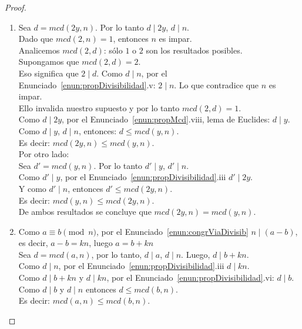 \begin{proof}
\begin{enumerate}[label=\roman*)]
Como $p \mid a$ entonces $a=pk$. \\
Como $p \mid b$ entonces $b=ph$. \\
Luego, $mcd(a,b) = ax + by = (pk)x + (ph)y = p(kx+hy)$. \\
Por lo tanto, $p \mid mcd(a,b)$.
\item Sea $d = mcd(2y,n)$. Por lo tanto $d \mid 2y$, $d \mid n$. \\
Dado que $mcd(2,n) = 1$, entonces $n$ es impar. \\
Analicemos $mcd(2,d)$: sólo $1$ o $2$ son los resultados posibles. \\
Supongamos que $mcd(2,d) = 2$. \\
Eso significa que $2 \mid d$. Como $d \mid n$, por el  Enunciado~\ref{enun:propDivisibilidad}.v: $2 \mid n$. Lo que contradice que $n$ es impar. \\
Ello invalida nuestro supuesto y por lo tanto $mcd(2,d) = 1$. \\
Como $d \mid 2y$, por el Enunciado~\ref{enun:propMcd}.viii, lema de Euclides: $d \mid y$. \\
Como $d \mid y$, $d \mid n$, entonces: $d \leq mcd(y,n)$. \\
Es decir: $mcd(2y,n) \leq mcd(y,n)$. \\
Por otro lado: \\
Sea $d' = mcd(y,n)$. Por lo tanto $d' \mid y$, $d' \mid n$. \\
Como $d' \mid y$, por el Enunciado~\ref{enun:propDivisibilidad}.iii $d' \mid 2y$. \\
Y como $d' \mid n$, entonces $d' \leq mcd(2y,n)$. \\
Es decir:  $mcd(y,n) \leq mcd(2y,n)$. \\
De ambos resultados se concluye que $mcd(2y,n) = mcd(y,n)$.
\item Como $a \equiv b \pmod n$, por el Enunciado~\ref{enun:congrViaDivisib} $n \mid (a-b)$, es decir, $a - b = kn$, luego  $a = b+kn$ \\
Sea $d = mcd(a,n)$, por lo tanto, $d \mid a$, $d \mid n$. Luego, $d \mid b+kn$. \\
Como $d \mid n$, por el Enunciado~\ref{enun:propDivisibilidad}.iii $d \mid kn$. \\  
Como $d \mid b+kn$ y $d \mid kn$, por el Enunciado~\ref{enun:propDivisibilidad}.vi: $d \mid b$. \\
Como $d \mid b$ y $d \mid n$ entonces $d \leq mcd(b,n)$. \\
Es decir: $mcd(a,n) \leq mcd(b,n)$. \\

\end{enumerate}
\end{proof}
